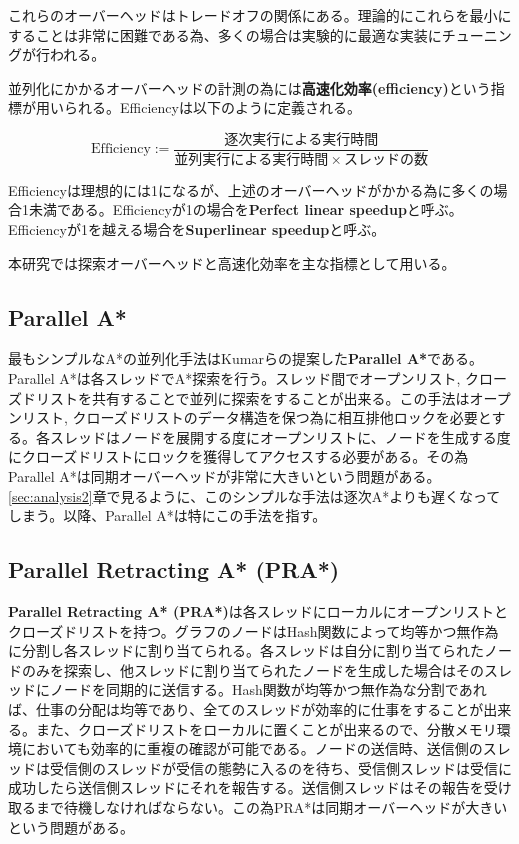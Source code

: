 \documentclass[uplatex]{jsarticle}
\begin{document}
これらのオーバーヘッドはトレードオフの関係にある。理論的にこれらを最小にすることは非常に困難である為、多くの場合は実験的に最適な実装にチューニングが行われる。

並列化にかかるオーバーヘッドの計測の為には\textbf{高速化効率(efficiency)}という指標が用いられる。Efficiencyは以下のように定義される。
\newline

\begin{equation}
	\mbox{Efficiency} := \frac{逐次実行による実行時間}{並列実行による実行時間 \times スレッドの数} 
\end{equation}

Efficiencyは理想的には1になるが、上述のオーバーヘッドがかかる為に多くの場合1未満である。Efficiencyが1の場合を\textbf{Perfect linear speedup}と呼ぶ。Efficiencyが1を越える場合を\textbf{Superlinear speedup}と呼ぶ。

本研究では探索オーバーヘッドと高速化効率を主な指標として用いる。

\subsection{Parallel A*}
最もシンプルなA*の並列化手法はKumarらの提案した\textbf{Parallel A*}である\cite{Kumar1988parallel}。Parallel A*は各スレッドでA*探索を行う。スレッド間でオープンリスト, クローズドリストを共有することで並列に探索をすることが出来る。この手法はオープンリスト, クローズドリストのデータ構造を保つ為に相互排他ロックを必要とする。各スレッドはノードを展開する度にオープンリストに、ノードを生成する度にクローズドリストにロックを獲得してアクセスする必要がある。その為Parallel A*は同期オーバーヘッドが非常に大きいという問題がある。\ref{sec:analysis2}章で見るように、このシンプルな手法は逐次A*よりも遅くなってしまう。以降、Parallel A*は特にこの手法を指す。


\subsection{Parallel Retracting A* (PRA*)}
\textbf{Parallel Retracting A* (PRA*)}は各スレッドにローカルにオープンリストとクローズドリストを持つ\cite{evett1995massively}。グラフのノードはHash関数によって均等かつ無作為に分割し各スレッドに割り当てられる。各スレッドは自分に割り当てられたノードのみを探索し、他スレッドに割り当てられたノードを生成した場合はそのスレッドにノードを同期的に送信する。Hash関数が均等かつ無作為な分割であれば、仕事の分配は均等であり、全てのスレッドが効率的に仕事をすることが出来る。また、クローズドリストをローカルに置くことが出来るので、分散メモリ環境においても効率的に重複の確認が可能である。ノードの送信時、送信側のスレッドは受信側のスレッドが受信の態勢に入るのを待ち、受信側スレッドは受信に成功したら送信側スレッドにそれを報告する。送信側スレッドはその報告を受け取るまで待機しなければならない。この為PRA*は同期オーバーヘッドが大きいという問題がある。
\newline
\end{document}
